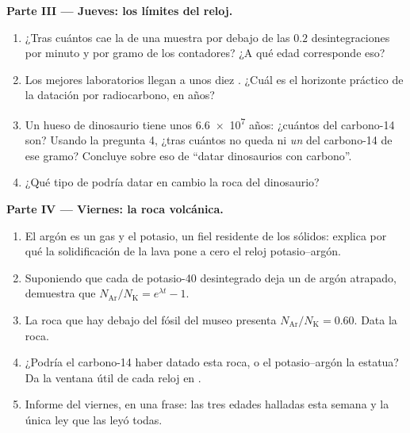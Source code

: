 \begin{problem}
\medskip
\noindent\textbf{Parte III --- Jueves: los límites del reloj.}
\begin{enumerate}[resume]
  \item ¿Tras cuántos  cae la  de una muestra
        por debajo de las $0.2$ desintegraciones por minuto y por gramo de los
        contadores? ¿A qué edad corresponde eso?
  \item Los mejores laboratorios llegan a unos diez . ¿Cuál es el horizonte
        práctico de la datación por radiocarbono, en años?
  \item Un hueso de dinosaurio tiene unos \num{6.6e7} años: ¿cuántos  del
        carbono-14 son? Usando la pregunta 4, ¿tras cuántos  no queda ni
        \emph{un}  del carbono-14 de ese gramo? Concluye sobre eso de ``datar
        dinosaurios con carbono''.
  \item ¿Qué tipo de  podría datar en cambio la roca del dinosaurio?
\end{enumerate}

\medskip
\noindent\textbf{Parte IV --- Viernes: la roca volcánica.}
\begin{enumerate}[resume]
  \item El argón es un gas y el potasio, un fiel residente de los sólidos: explica por
        qué la solidificación de la lava pone a cero el reloj potasio--argón.
  \item Suponiendo que cada  de potasio-40 desintegrado deja un  de argón
        atrapado, demuestra que
        $N_{\mathrm{Ar}}/N_{\mathrm K} = e^{\lambda t} - 1$.
  \item La roca que hay debajo del fósil del museo presenta
        $N_{\mathrm{Ar}}/N_{\mathrm K} = 0.60$. Data la roca.
  \item ¿Podría el carbono-14 haber datado esta roca, o el potasio--argón la estatua?
        Da la ventana útil de cada reloj en .
  \item Informe del viernes, en una frase: las tres edades halladas esta semana y la
        única ley que las leyó todas.
\end{enumerate}
\end{problem}
